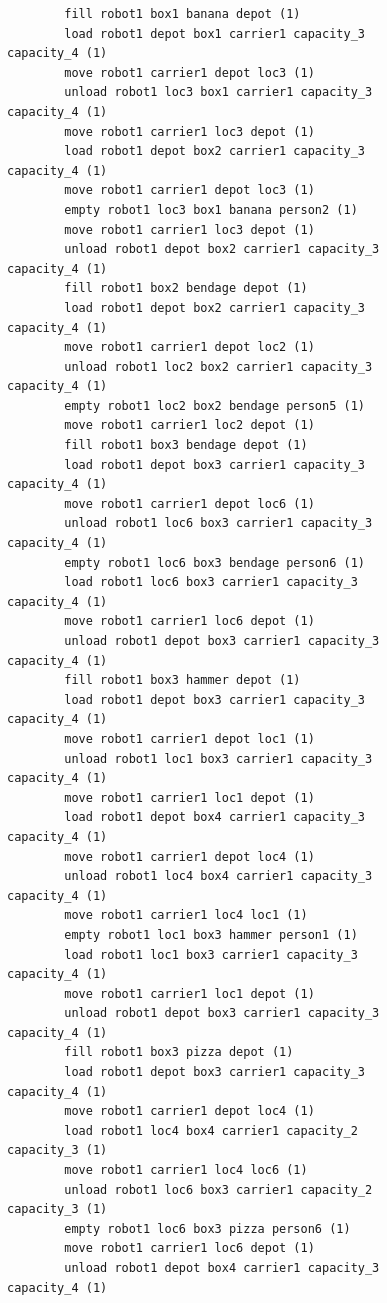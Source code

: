 \begin{figure}
    \small
    \begin{verbatim}
        fill robot1 box1 banana depot (1)
        load robot1 depot box1 carrier1 capacity_3 capacity_4 (1)
        move robot1 carrier1 depot loc3 (1)
        unload robot1 loc3 box1 carrier1 capacity_3 capacity_4 (1)
        move robot1 carrier1 loc3 depot (1)
        load robot1 depot box2 carrier1 capacity_3 capacity_4 (1)
        move robot1 carrier1 depot loc3 (1)
        empty robot1 loc3 box1 banana person2 (1)
        move robot1 carrier1 loc3 depot (1)
        unload robot1 depot box2 carrier1 capacity_3 capacity_4 (1)
        fill robot1 box2 bendage depot (1)
        load robot1 depot box2 carrier1 capacity_3 capacity_4 (1)
        move robot1 carrier1 depot loc2 (1)
        unload robot1 loc2 box2 carrier1 capacity_3 capacity_4 (1)
        empty robot1 loc2 box2 bendage person5 (1)
        move robot1 carrier1 loc2 depot (1)
        fill robot1 box3 bendage depot (1)
        load robot1 depot box3 carrier1 capacity_3 capacity_4 (1)
        move robot1 carrier1 depot loc6 (1)
        unload robot1 loc6 box3 carrier1 capacity_3 capacity_4 (1)
        empty robot1 loc6 box3 bendage person6 (1)
        load robot1 loc6 box3 carrier1 capacity_3 capacity_4 (1)
        move robot1 carrier1 loc6 depot (1)
        unload robot1 depot box3 carrier1 capacity_3 capacity_4 (1)
        fill robot1 box3 hammer depot (1)
        load robot1 depot box3 carrier1 capacity_3 capacity_4 (1)
        move robot1 carrier1 depot loc1 (1)
        unload robot1 loc1 box3 carrier1 capacity_3 capacity_4 (1)
        move robot1 carrier1 loc1 depot (1)
        load robot1 depot box4 carrier1 capacity_3 capacity_4 (1)
        move robot1 carrier1 depot loc4 (1)
        unload robot1 loc4 box4 carrier1 capacity_3 capacity_4 (1)
        move robot1 carrier1 loc4 loc1 (1)
        empty robot1 loc1 box3 hammer person1 (1)
        load robot1 loc1 box3 carrier1 capacity_3 capacity_4 (1)
        move robot1 carrier1 loc1 depot (1)
        unload robot1 depot box3 carrier1 capacity_3 capacity_4 (1)
        fill robot1 box3 pizza depot (1)
        load robot1 depot box3 carrier1 capacity_3 capacity_4 (1)
        move robot1 carrier1 depot loc4 (1)
        load robot1 loc4 box4 carrier1 capacity_2 capacity_3 (1)
        move robot1 carrier1 loc4 loc6 (1)
        unload robot1 loc6 box3 carrier1 capacity_2 capacity_3 (1)
        empty robot1 loc6 box3 pizza person6 (1)
        move robot1 carrier1 loc6 depot (1)
        unload robot1 depot box4 carrier1 capacity_3 capacity_4 (1)

\end{verbatim}
\end{figure}
